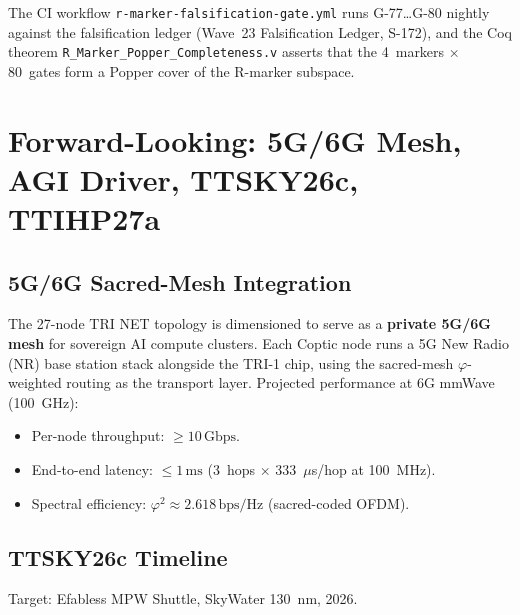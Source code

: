 The CI workflow \texttt{r-marker-falsification-gate.yml} runs G-77\ldots G-80
nightly against the falsification ledger (Wave~23 Falsification Ledger, S-172),
and the Coq theorem \texttt{R\_Marker\_Popper\_Completeness.v} asserts that
the 4~markers \(\times\) 80~gates form a Popper cover of the R-marker subspace.


\section{Forward-Looking: 5G/6G Mesh, AGI Driver, TTSKY26c, TTIHP27a}
\label{sec:flos74-forward}

\subsection{5G/6G Sacred-Mesh Integration}

The 27-node TRI NET topology is dimensioned to serve as a \textbf{private
5G/6G mesh} for sovereign AI compute clusters.
Each Coptic node runs a 5G New Radio (NR) base station stack alongside the
TRI-1 chip, using the sacred-mesh \(\varphi\)-weighted routing as the
transport layer.
Projected performance at 6G mmWave (100~GHz):
\begin{itemize}
  \item Per-node throughput: \(\ge 10\,\text{Gbps}\).
  \item End-to-end latency: \(\le 1\,\text{ms}\) (3~hops \(\times\)
        333~\(\mu\)s/hop at 100~MHz).
  \item Spectral efficiency: \(\varphi^2 \approx 2.618\,\text{bps/Hz}\)
        (sacred-coded OFDM).
\end{itemize}

\subsection{TTSKY26c Timeline}

Target: Efabless MPW Shuttle, SkyWater 130~nm, 2026.

